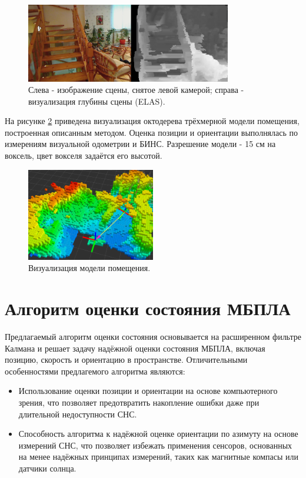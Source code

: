 \documentclass[12pt,a4paper]{article}
\begin{document}
\begin{figure}[!htbp]
    \centering
    \includegraphics[width=0.8\textwidth]{disparity.jpg}
    \caption{\label{fig:disparity}Слева - изображение сцены, снятое левой камерой; справа - визуализация глубины сцены (ELAS).}
\end{figure}

На рисунке \ref{fig:octomap} приведена визуализация октодерева трёхмерной модели помещения, построенная описанным методом. Оценка позиции и ориентации выполнялась по измерениям визуальной одометрии и БИНС. Разрешение модели - 15 см на воксель, цвет вокселя задаётся его высотой.

\begin{figure}[!htbp]
    \centering
    \includegraphics[width=0.5\textwidth]{octomap.png}
    \caption{\label{fig:octomap}Визуализация модели помещения.}
\end{figure}

\section{Алгоритм оценки состояния МБПЛА}

Предлагаемый алгоритм оценки состояния основывается на расширенном фильтре Калмана и решает задачу надёжной оценки состояния МБПЛА, включая позицию, скорость и ориентацию в пространстве. Отличительными особенностями предлагемого алгоритма являются:

\begin{itemize}
    \item Использование оценки позиции и ориентации на основе компьютерного зрения, что позволяет предотвратить накопление ошибки даже при длительной недоступности СНС.
    \item Способность алгоритма к надёжной оценке ориентации по азимуту на основе измерений СНС, что позволяет избежать применения сенсоров, основанных на менее надёжных принципах измерений, таких как магнитные компасы или датчики солнца.
\end{itemize}
\end{document}
